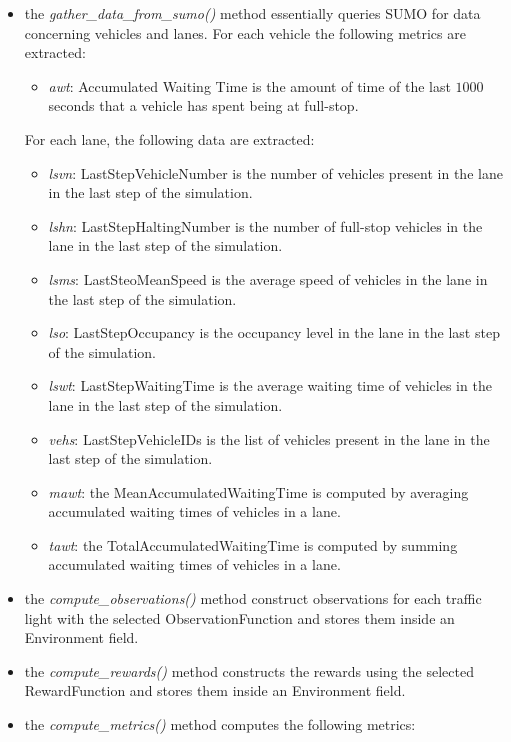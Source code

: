 \begin{itemize}
  \item the \textit{gather\_data\_from\_sumo()} method essentially queries SUMO for data concerning vehicles and lanes. For each vehicle the following metrics are extracted:
  \begin{itemize}
    \item \textit{awt}: Accumulated Waiting Time is the amount of time of the last $1000$ seconds that a vehicle has spent being at full-stop.
  \end{itemize}
  For each lane, the following data are extracted:
  \begin{itemize}
      \item \textit{lsvn}: LastStepVehicleNumber is the number of vehicles present in the lane in the last step of the simulation.
      \item \textit{lshn}: LastStepHaltingNumber is the number of full-stop vehicles in the lane in the last step of the simulation.
      \item \textit{lsms}: LastSteoMeanSpeed is the average speed of vehicles in the lane in the last step of the simulation.
      \item \textit{lso}: LastStepOccupancy is the occupancy level in the lane in the last step of the simulation.
      \item \textit{lswt}: LastStepWaitingTime is the average waiting time of vehicles in the lane in the last step of the simulation.
      \item \textit{vehs}: LastStepVehicleIDs is the list of vehicles present in the lane in the last step of the simulation.
      \item \textit{mawt}: the MeanAccumulatedWaitingTime is computed by averaging accumulated waiting times of vehicles in a lane.
      \item \textit{tawt}: the TotalAccumulatedWaitingTime is computed by summing accumulated waiting times of vehicles in a lane.
  \end{itemize}
  \item the \textit{compute\_observations()} method construct observations for each traffic light with the selected ObservationFunction and stores them inside an Environment field.
  \item the \textit{compute\_rewards()} method constructs the rewards using the selected RewardFunction and stores them inside an Environment field.
  \item the \textit{compute\_metrics()} method computes the following metrics:

\end{itemize}
